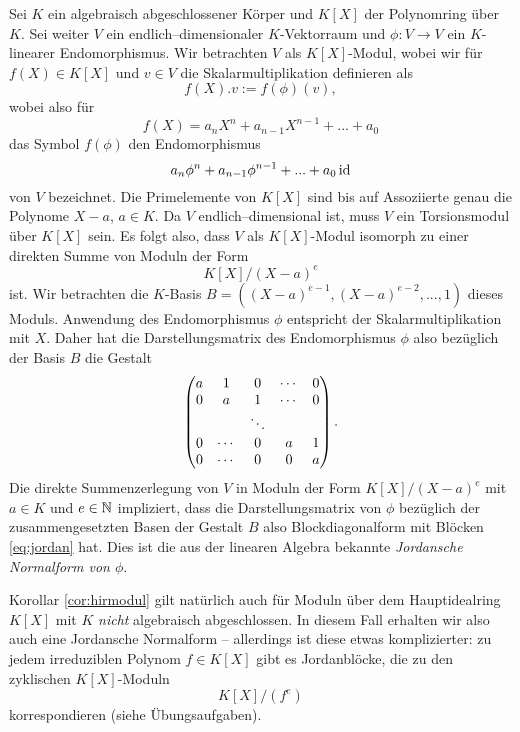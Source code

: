 \documentclass{book}
\begin{document}
\begin{exa}
    \label{exa:jordancanonical}
    Sei $K$ ein algebraisch abgeschlossener Körper und $K[X]$ der Polynomring
    über $K$. Sei weiter $V$ ein endlich--dimensionaler $K$-Vektorraum und
    $\phi: V \to V$ ein $K$-linearer Endomorphismus. 
    Wir betrachten $V$ als $K[X]$-Modul, wobei wir für $f(X) \in K[X]$ und $v \in V$ die Skalarmultiplikation definieren als
    \[
        f(X).v := f(\phi)(v), 
    \]
    wobei also für 
    \[
        f(X) = a_n X^n + a_{n-1} X^{n-1} + ... + a_0
    \]
    das Symbol $f(\phi)$ den Endomorphismus 
    \[
        a_n \phi^n + a_{n-1} \phi^{n-1} + ... + a_0 \id
    \]
    von $V$ bezeichnet. Die Primelemente von $K[X]$ sind bis auf Assoziierte
    genau die Polynome $X-a$, $a \in K$. Da $V$ endlich--dimensional ist, muss
    $V$ ein Torsionsmodul über $K[X]$ sein. Es folgt also, dass $V$ als
    $K[X]$-Modul isomorph zu einer direkten Summe von Moduln der Form
    \[
        K[X]/(X-a)^e
    \]
    ist. Wir betrachten die $K$-Basis $B = ((X-a)^{e-1}, (X-a)^{e-2}, ..., 1)$
    dieses Moduls. Anwendung des Endomorphismus $\phi$ entspricht der
    Skalarmultiplikation mit $X$. Daher hat die Darstellungsmatrix des Endomorphismus $\phi$ also
    bezüglich der Basis $B$ die Gestalt
    \begin{equation}
        \label{eq:jordan}
    \begin{pmatrix}  a & 1 & 0 &  \cdots & 0\\
        0 & a &  1 &  \cdots & 0\\
          & & \ddots & &  \\
        0 & \cdots  & 0 &  a & 1\\
        0 & \cdots & 0 & 0 & a \end{pmatrix}.
    \end{equation}
    Die direkte Summenzerlegung von $V$ in Moduln der Form $K[X]/(X-a)^e$ mit
    $a \in K$ und $e \in \mathbb{N}$ impliziert, dass die Darstellungsmatrix von
    $\phi$ bezüglich der zusammengesetzten Basen der Gestalt $B$ also
    Blockdiagonalform mit Blöcken \eqref{eq:jordan} hat. Dies ist
    die aus der linearen Algebra bekannte {\em Jordansche Normalform von
    $\phi$}. 

    Korollar \ref{cor:hirmodul} gilt natürlich auch für Moduln über dem
    Hauptidealring $K[X]$ mit $K$ {\em nicht} algebraisch abgeschlossen. In
    diesem Fall erhalten wir also auch eine Jordansche Normalform -- allerdings
    ist diese etwas komplizierter: zu jedem irreduziblen Polynom $f \in K[X]$
    gibt es Jordanblöcke, die zu den zyklischen $K[X]$-Moduln
    \[
        K[X]/(f^e)
    \]
    korrespondieren (siehe Übungsaufgaben).
\end{exa}
\end{document}
